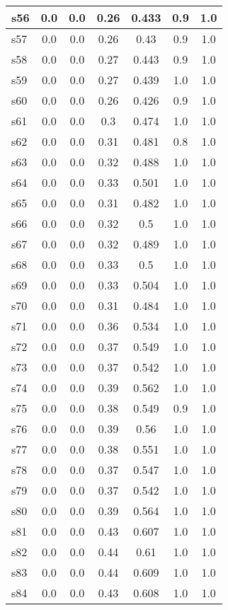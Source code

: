 \documentclass{article}
\begin{document}
\begin{tabular}{|l|c|c|c|c|c|c|}
\hline
s56 &0.0 & 0.0 & 0.26 & 0.433 & 0.9 & 1.0\\
\hline
s57 &0.0 & 0.0 & 0.26 & 0.43 & 0.9 & 1.0\\
\hline
s58 &0.0 & 0.0 & 0.27 & 0.443 & 0.9 & 1.0\\
\hline
s59 &0.0 & 0.0 & 0.27 & 0.439 & 1.0 & 1.0\\
\hline
s60 &0.0 & 0.0 & 0.26 & 0.426 & 0.9 & 1.0\\
\hline
s61 &0.0 & 0.0 & 0.3 & 0.474 & 1.0 & 1.0\\
\hline
s62 &0.0 & 0.0 & 0.31 & 0.481 & 0.8 & 1.0\\
\hline
s63 &0.0 & 0.0 & 0.32 & 0.488 & 1.0 & 1.0\\
\hline
s64 &0.0 & 0.0 & 0.33 & 0.501 & 1.0 & 1.0\\
\hline
s65 &0.0 & 0.0 & 0.31 & 0.482 & 1.0 & 1.0\\
\hline
s66 &0.0 & 0.0 & 0.32 & 0.5 & 1.0 & 1.0\\
\hline
s67 &0.0 & 0.0 & 0.32 & 0.489 & 1.0 & 1.0\\
\hline
s68 &0.0 & 0.0 & 0.33 & 0.5 & 1.0 & 1.0\\
\hline
s69 &0.0 & 0.0 & 0.33 & 0.504 & 1.0 & 1.0\\
\hline
s70 &0.0 & 0.0 & 0.31 & 0.484 & 1.0 & 1.0\\
\hline
s71 &0.0 & 0.0 & 0.36 & 0.534 & 1.0 & 1.0\\
\hline
s72 &0.0 & 0.0 & 0.37 & 0.549 & 1.0 & 1.0\\
\hline
s73 &0.0 & 0.0 & 0.37 & 0.542 & 1.0 & 1.0\\
\hline
s74 &0.0 & 0.0 & 0.39 & 0.562 & 1.0 & 1.0\\
\hline
s75 &0.0 & 0.0 & 0.38 & 0.549 & 0.9 & 1.0\\
\hline
s76 &0.0 & 0.0 & 0.39 & 0.56 & 1.0 & 1.0\\
\hline
s77 &0.0 & 0.0 & 0.38 & 0.551 & 1.0 & 1.0\\
\hline
s78 &0.0 & 0.0 & 0.37 & 0.547 & 1.0 & 1.0\\
\hline
s79 &0.0 & 0.0 & 0.37 & 0.542 & 1.0 & 1.0\\
\hline
s80 &0.0 & 0.0 & 0.39 & 0.564 & 1.0 & 1.0\\
\hline
s81 &0.0 & 0.0 & 0.43 & 0.607 & 1.0 & 1.0\\
\hline
s82 &0.0 & 0.0 & 0.44 & 0.61 & 1.0 & 1.0\\
\hline
s83 &0.0 & 0.0 & 0.44 & 0.609 & 1.0 & 1.0\\
\hline
s84 &0.0 & 0.0 & 0.43 & 0.608 & 1.0 & 1.0\\

\end{tabular}
\end{document}
